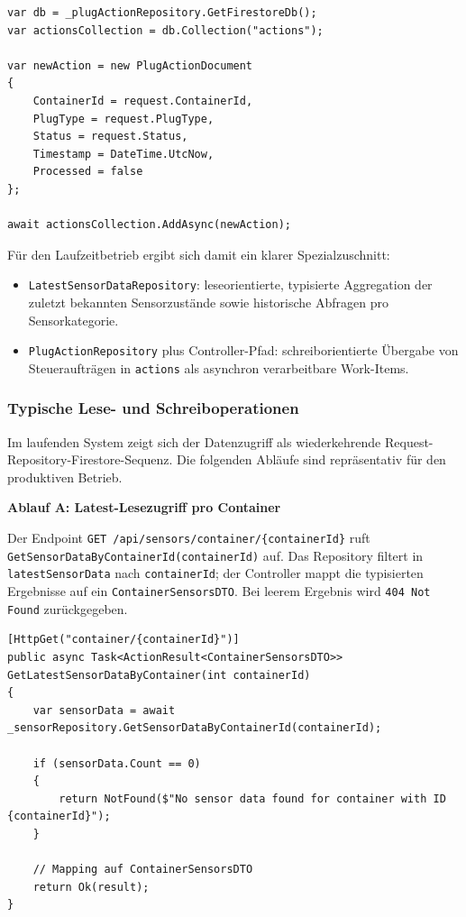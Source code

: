\begin{lstlisting}[language={[Sharp]C},caption={Schreibpfad in die actions-Collection},label={lst:db:actions:write-path},basicstyle=\ttfamily\small,breaklines=true,breakatwhitespace=false,columns=fullflexible]
var db = _plugActionRepository.GetFirestoreDb();
var actionsCollection = db.Collection("actions");

var newAction = new PlugActionDocument
{
    ContainerId = request.ContainerId,
    PlugType = request.PlugType,
    Status = request.Status,
    Timestamp = DateTime.UtcNow,
    Processed = false
};

await actionsCollection.AddAsync(newAction);
\end{lstlisting}

Für den Laufzeitbetrieb ergibt sich damit ein klarer Spezialzuschnitt:

\begin{itemize}
    \item \texttt{LatestSensorDataRepository}: leseorientierte, typisierte Aggregation der zuletzt bekannten Sensorzustände sowie historische Abfragen pro Sensorkategorie.
    \item \texttt{PlugActionRepository} plus Controller-Pfad: schreiborientierte Übergabe von Steueraufträgen in \texttt{actions} als asynchron verarbeitbare Work-Items.
\end{itemize}

\subsubsection{Typische Lese- und Schreiboperationen}

Im laufenden System zeigt sich der Datenzugriff als wiederkehrende Request-Repository-Firestore-Sequenz. Die folgenden Abläufe sind repräsentativ für den produktiven Betrieb.

\textbf{Ablauf A: Latest-Lesezugriff pro Container}

Der Endpoint \texttt{GET /api/sensors/container/\{containerId\}} ruft \texttt{GetSensorDataByContainerId(containerId)} auf. Das Repository filtert in \texttt{latestSensorData} nach \texttt{containerId}; der Controller mappt die typisierten Ergebnisse auf ein \texttt{ContainerSensorsDTO}. Bei leerem Ergebnis wird \texttt{404 Not Found} zurückgegeben.

\begin{lstlisting}[language={[Sharp]C},caption={Latest-Read mit NotFound-Fallback},label={lst:db:ops:latest-read},basicstyle=\ttfamily\small,breaklines=true,breakatwhitespace=false,columns=fullflexible]
[HttpGet("container/{containerId}")]
public async Task<ActionResult<ContainerSensorsDTO>> GetLatestSensorDataByContainer(int containerId)
{
    var sensorData = await _sensorRepository.GetSensorDataByContainerId(containerId);

    if (sensorData.Count == 0)
    {
        return NotFound($"No sensor data found for container with ID {containerId}");
    }

    // Mapping auf ContainerSensorsDTO
    return Ok(result);
}
\end{lstlisting}

